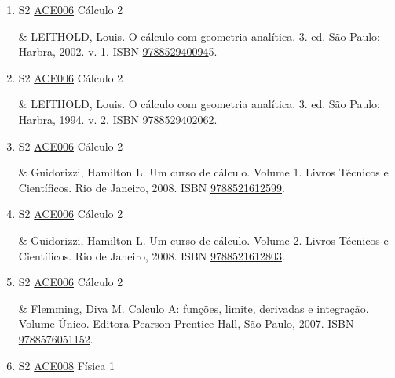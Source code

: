 \documentclass[12pt,a4paper]{book}
\begin{document}
\begin{enumerate}
 

 \item S2 \hyperref[PUD:ACE006]{ACE006} Cálculo 2

& LEITHOLD, Louis.  O cálculo com geometria analítica.  3.  ed.  São Paulo: Harbra, 2002.  v.  1.  ISBN 
\href{http://www.bn.br/site/pages/servicosProfissionais/agenciaISBN/isbnBusca/FbnBuscaISBNCatalogo.asp?pField=ISBN&pIntPagina=1&pISBN=2940094&nidbISBN=true&hidbISBN=true}{978852940094}5. 

 

 \item S2 \hyperref[PUD:ACE006]{ACE006} Cálculo 2

& LEITHOLD, Louis.  O cálculo com geometria analítica.  3.  ed.  São Paulo: Harbra, 1994.  v.  2.  ISBN \href{http://www.bn.br/site/pages/servicosProfissionais/agenciaISBN/isbnBusca/FbnBuscaISBNCatalogo.asp?pField=ISBN&pIntPagina=1&pISBN=29402062&nidbISBN=true&hidbISBN=true}{9788529402062}.
 \item S2 \hyperref[PUD:ACE006]{ACE006} Cálculo 2

&  Guidorizzi, Hamilton L.  Um curso de cálculo.  Volume 1.  Livros Técnicos e Científicos.  Rio de Janeiro, 2008.  ISBN \href{http://www.bn.br/site/pages/servicosProfissionais/agenciaISBN/isbnBusca/FbnBuscaISBNCatalogo.asp?pField=ISBN&pIntPagina=1&pISBN=21612599&nidbISBN=true&hidbISBN=true}{9788521612599}. 

 

 \item S2 \hyperref[PUD:ACE006]{ACE006} Cálculo 2

&  Guidorizzi, Hamilton L.  Um curso de cálculo.  Volume 2.  Livros Técnicos e Científicos.  Rio de Janeiro, 2008.  ISBN \href{http://www.bn.br/site/pages/servicosProfissionais/agenciaISBN/isbnBusca/FbnBuscaISBNCatalogo.asp?pField=ISBN&pIntPagina=1&pISBN=21612803&nidbISBN=true&hidbISBN=true}{9788521612803}. 

 

 \item S2 \hyperref[PUD:ACE006]{ACE006} Cálculo 2

&  Flemming, Diva M.  Calculo A: funções, limite, derivadas e integração.  Volume Único.  Editora Pearson Prentice Hall, São Paulo, 2007.  ISBN \href{http://www.bn.br/site/pages/servicosProfissionais/agenciaISBN/isbnBusca/FbnBuscaISBNCatalogo.asp?pField=ISBN&pIntPagina=1&pISBN=76051152&nidbISBN=true&hidbISBN=true}{9788576051152}.
 \item S2 \hyperref[PUD:ACE008]{ACE008} Física 1


\end{enumerate}
\end{document}
